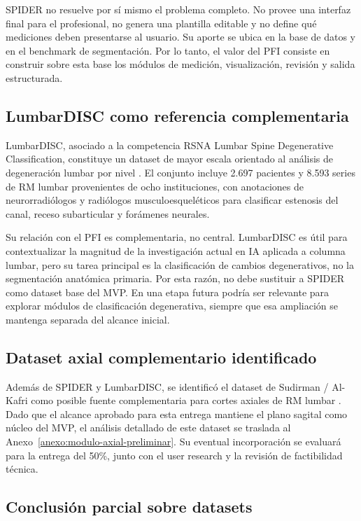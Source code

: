 SPIDER no resuelve por sí mismo el problema completo. No provee una interfaz final para el profesional, no genera una plantilla editable y no define qué mediciones deben presentarse al usuario. Su aporte se ubica en la base de datos y en el benchmark de segmentación. Por lo tanto, el valor del PFI consiste en construir sobre esta base los módulos de medición, visualización, revisión y salida estructurada.

\subsection{LumbarDISC como referencia complementaria}

LumbarDISC, asociado a la competencia RSNA Lumbar Spine Degenerative Classification, constituye un dataset de mayor escala orientado al análisis de degeneración lumbar por nivel \parencite{richards_lumbardisc_2026}. El conjunto incluye 2.697 pacientes y 8.593 series de RM lumbar provenientes de ocho instituciones, con anotaciones de neurorradiólogos y radiólogos musculoesqueléticos para clasificar estenosis del canal, receso subarticular y forámenes neurales.

Su relación con el PFI es complementaria, no central. LumbarDISC es útil para contextualizar la magnitud de la investigación actual en IA aplicada a columna lumbar, pero su tarea principal es la clasificación de cambios degenerativos, no la segmentación anatómica primaria. Por esta razón, no debe sustituir a SPIDER como dataset base del MVP. En una etapa futura podría ser relevante para explorar módulos de clasificación degenerativa, siempre que esa ampliación se mantenga separada del alcance inicial.

\subsection{Dataset axial complementario identificado}

Además de SPIDER y LumbarDISC, se identificó el dataset de Sudirman / Al-Kafri como posible fuente complementaria para cortes axiales de RM lumbar \parencite{alkafri_sudirman_boundary_2019}. Dado que el alcance aprobado para esta entrega mantiene el plano sagital como núcleo del MVP, el análisis detallado de este dataset se traslada al Anexo~\ref{anexo:modulo-axial-preliminar}. Su eventual incorporación se evaluará para la entrega del 50\%, junto con el user research y la revisión de factibilidad técnica.

\subsection{Conclusión parcial sobre datasets}

